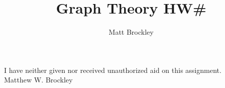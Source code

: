 \documentclass[12pt, letterpaper]{article}
\author{Matt Brockley}
\title{Graph Theory HW#}
\begin{document}
	
	
	
	\begin{center}
		I have neither given nor received unauthorized aid on this assignment.\\
		Matthew W. Brockley	
	\end{center}
\end{document}
